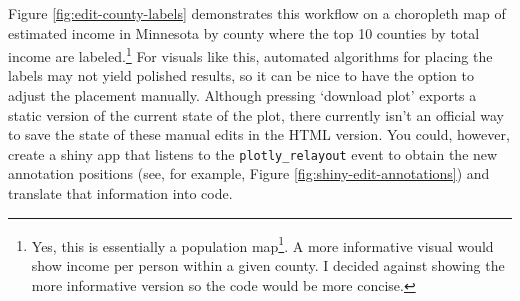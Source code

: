 \documentclass[
  12pt,
]{krantz}
\renewcommand{\href}[2]{#2\footnote{\url{#1}}}
\begin{document}
Figure \ref{fig:edit-county-labels} demonstrates this workflow on a choropleth map of estimated income in Minnesota by county where the top 10 counties by total income are labeled.\footnote{Yes, this is \href{https://xkcd.com/1138/}{essentially a population map}. A more informative visual would show income per person within a given county. I decided against showing the more informative version so the code would be more concise.} For visuals like this, automated algorithms for placing the labels may not yield polished results, so it can be nice to have the option to adjust the placement manually. Although pressing `download plot' exports a static version of the current state of the plot, there currently isn't an official way to save the state of these manual edits in the HTML version. You could, however, create a shiny app that listens to the \texttt{\textquotesingle{}plotly\_relayout\textquotesingle{}} event to obtain the new annotation positions (see, for example, Figure \ref{fig:shiny-edit-annotations}) and translate that information into code.
\end{document}
